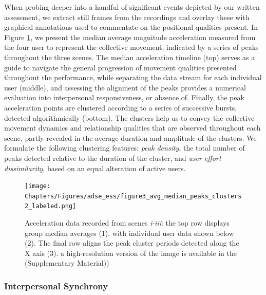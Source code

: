 When probing deeper into a handful of significant events depicted by our written assessment, we extract still frames from the recordings and overlay these with graphical annotations used to commentate on the positional qualities present. In Figure \ref{fig:sensor_data}, we present the median average magnitude acceleration measured from the four user to represent the collective movement, indicated by a series of peaks throughout the three scenes. The median acceleration timeline (top) serves as a guide to navigate the general progression of movement qualities presented throughout the performance, while separating the data stream for each individual user (middle), and assessing the alignment of the peaks provides a numerical evaluation into interpersonal responsiveness, or absence of. Finally, the peak acceleration points are clustered according to a series of successive bursts, detected algorithmically (bottom). The clusters help us to convey the collective movement dynamics and relationship qualities that are observed throughout each scene, partly revealed in the average duration and amplitude of the clusters. We formulate the following clustering features: \textit{peak density}, the total number of peaks detected relative to the duration of the cluster, and \textit{user effort dissimilarity}, based on an equal alteration of active users.

\begin{adjustwidth}{-9cm}{}
\begin{figure}[!h]
\centering
\texttt{[image: Chapters/Figures/adse\_ess/figure3\_avg\_median\_peaks\_clusters2\_labeled.png]}
\caption[Acceleration data recorded from scenes]{Acceleration data recorded from scenes \textit{i}-\textit{iii}: the top row displays group median averages (1), with individual user data shown below (2). The final row aligns the peak cluster periods detected along the X axis (3).
a high-resolution version of the image is available in the (Supplementary Material))}\label{fig:sensor_data}
\vspace*{-20pt}
\end{figure}
\end{adjustwidth}

\subsubsection{Interpersonal Synchrony}


